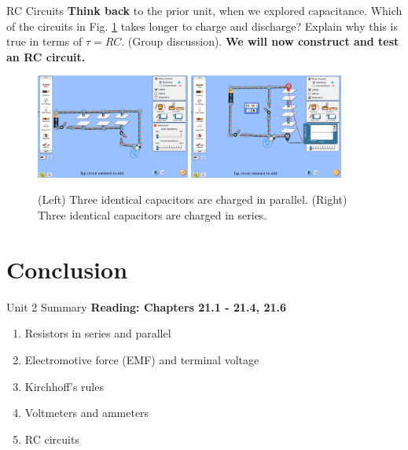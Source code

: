 \documentclass{beamer}
\begin{document}
\begin{frame}{RC Circuits}
\small
\textbf{\alert{Think back}} to the prior unit, when we explored capacitance.  Which of the circuits in Fig. \ref{fig:three_cap} takes longer to charge and discharge?  Explain why this is true in terms of $\tau = RC$. (Group discussion).  \textbf{We will now construct and test an RC circuit.}
\begin{figure}
\centering
\includegraphics[width=0.45\textwidth]{figures/three_cap_2.png}
\includegraphics[width=0.45\textwidth]{figures/three_cap_3.png}
\caption{\label{fig:three_cap} (Left) Three identical capacitors are charged in parallel. (Right) Three identical capacitors are charged in series.}
\end{figure}
\end{frame}

\section{Conclusion}

\begin{frame}{Unit 2 Summary}
\textbf{Reading: Chapters 21.1 - 21.4, 21.6}
\begin{enumerate}
\item Resistors in series and parallel
\item Electromotive force (EMF) and terminal voltage
\item Kirchhoff's rules
\item Voltmeters and ammeters
\item RC circuits
\end{enumerate}
\end{frame}
\end{document}
